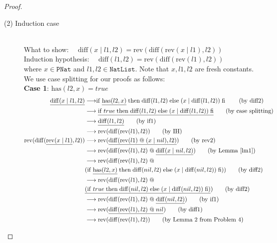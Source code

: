 \documentclass[12pt, a4paper]{article}
\newcommand{\rel}[1]{\mathrel{#1}}
\newcommand{\rmx}[1]{\mathrm{#1}}
\newcommand{\larrow}{\longrightarrow}
\newcommand{\under}{\underline}
\begin{document}
\begin{proof}
\begin{description}
\item[(2) Induction case]~\\
What to show: $\quad \rmx{diff}(x \rel{|} l1, l2) = \rmx{rev}(\rmx{diff}(\rmx{rev}(x \rel{|} l1), l2))$ \\
Induction hypothesis: $\quad \rmx{diff}(l1, l2) = \rmx{rev}(\rmx{diff}(\rmx{rev}(l1), l2))$  \\
where $x \in \mathtt{PNat}$ and $l1, l2 \in \mathtt{NatList}$. 
Note that $x, l1, l2$ are fresh constants. \\
We use case splitting for our proofs as follows: \\
\textbf{Case 1}: $\rmx{has}(l2, x) = true$
\begin{align*}
\under{\rmx{diff}(x \rel{|} l1, l2)}
	&\larrow \rel{\rmx{if}} \under{\rmx{has}(l2, x)} \rel{\rmx{then}} \rmx{diff}(l1, l2) \rel{\rmx{else}} (x \rel{|} \rmx{diff}(l1, l2)) \rel{\rmx{fi}} \tag{by diff2} \\
	&\larrow \under{\rel{\rmx{if}} true \rel{\rmx{then}} \rmx{diff}(l1, l2) \rel{\rmx{else}} (x \rel{|} \rmx{diff}(l1, l2)) \rel{\rmx{fi}}} \tag{by case splitting} \\
	&\larrow \under{\rmx{diff}(l1, l2)} \tag{by if1} \\
	&\larrow \rmx{rev}(\rmx{diff}(\rmx{rev}(l1), l2)) \tag{by IH} \\
\rmx{rev}(\rmx{diff}(\under{\rmx{rev}(x \rel{|} l1)}, l2)) 
	&\larrow  \rmx{rev}(\under{\rmx{diff}(\rmx{rev}(l1) \rel{@} (x \rel{|} nil), l2)}) \tag{by rev2} \\
	&\larrow  \rmx{rev}(\rmx{diff}(\rmx{rev}(l1), l2) \rel{@} \under{\rmx{diff}(x \rel{|} nil, l2)}) \tag{by Lemma~\ref{lm1}} \\
	&\larrow  \rmx{rev}(\rmx{diff}(\rmx{rev}(l1), l2) \rel{@} \\
	&(\rel{\rmx{if}} \under{\rmx{has}(l2, x)} \rel{\rmx{then}} \rmx{diff}(nil, l2) \rel{\rmx{else}} (x \rel{|} \rmx{diff}(nil, l2)) \rel{\rmx{fi}})) \tag{by diff2} \\
	&\larrow  \rmx{rev}(\rmx{diff}(\rmx{rev}(l1), l2) \rel{@} \\
	&\under{(\rel{\rmx{if}} true \rel{\rmx{then}} \rmx{diff}(nil, l2) \rel{\rmx{else}} (x \rel{|} \rmx{diff}(nil, l2)) \rel{\rmx{fi}})}) \tag{by diff2} \\
	&\larrow  \rmx{rev}(\rmx{diff}(\rmx{rev}(l1), l2) \rel{@} \under{\rmx{diff}(nil, l2)}) \tag{by if1} \\
	&\larrow  \rmx{rev}(\under{\rmx{diff}(\rmx{rev}(l1), l2) \rel{@} nil}) \tag{by diff1} \\
	&\larrow  \rmx{rev}(\rmx{diff}(\rmx{rev}(l1), l2)) \tag{by Lemma 2 from Problem 4}
\end{align*}


\end{description}
\end{proof}
\end{document}
